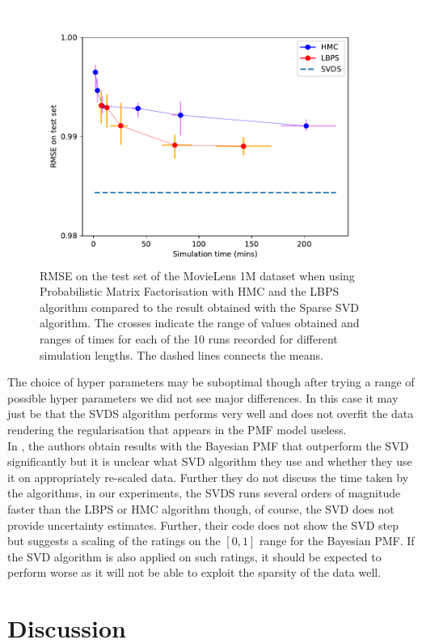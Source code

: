 \begin{figure}[!h]
	\center
	\includegraphics[width=.8\textwidth]{figures/lbp/curves}
	\caption{\label{fig:LBPSvHMC}RMSE on the test set of the MovieLens 1M dataset when using Probabilistic Matrix Factorisation with HMC and the LBPS algorithm compared to the result obtained with the Sparse SVD algorithm. The crosses indicate the range of values obtained and ranges of times for each of the 10 runs recorded for different simulation lengths. The dashed lines connects the means.}
\end{figure}


The choice of hyper parameters may be suboptimal though after trying a range of possible hyper parameters we did not see major differences. In this case it may just be that the SVDS algorithm performs very well and does not overfit the data rendering the regularisation that appears in the PMF model useless. \\
In \citep{mnih08}, the authors obtain results with the Bayesian PMF that outperform the SVD significantly but it is unclear what SVD algorithm they use and whether they use it on appropriately re-scaled data. 
Further they do not discuss the time taken by the algorithms, in our experiments, the SVDS runs several orders of magnitude faster than the LBPS or HMC algorithm though, of course, the SVD does not provide uncertainty estimates. 
Further, their code does not show the SVD step but suggests a scaling of the ratings on the $[0, 1]$ range for the Bayesian PMF. If the SVD algorithm is also applied on such ratings, it should be expected to perform worse as it will not be able to exploit the sparsity of the data well.

\section{Discussion}

